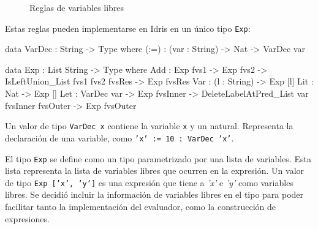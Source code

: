 \begin{figure}[h]

\centering

\begin{subfigure}{0.5\linewidth}
\centering
{}
\end{subfigure}%

\bigskip

\begin{subfigure}{0.5\linewidth}
\centering
{}
\end{subfigure}%

\bigskip

\begin{subfigure}{0.5\linewidth}
\centering
{}
\end{subfigure}%

\bigskip

\begin{subfigure}{0.5\linewidth}
\centering
{}
\end{subfigure}%

\caption{Reglas de variables libres}
\label{fig:RulesFreeVariables}
\end{figure}

Estas reglas pueden implementarse en Idris en un único tipo \texttt{Exp}:

\begin{code}
data VarDec : String -> Type where
  (:=) : (var : String) -> Nat -> VarDec var

data Exp : List String -> Type where
  Add : Exp fvs1 -> Exp fvs2 ->
    IsLeftUnion_List fvs1 fvs2 fvsRes ->
    Exp fvsRes
  Var : (l : String) -> Exp [l]
  Lit : Nat -> Exp []
  Let : VarDec var -> Exp fvsInner ->
    DeleteLabelAtPred_List var fvsInner fvsOuter ->
    Exp fvsOuter
\end{code}

Un valor de tipo \texttt{VarDec x} contiene la variable \texttt{x} y un natural. Representa la declaración de una variable, como \texttt{'x' := 10 : VarDec 'x'}.

El tipo \texttt{Exp} se define como un tipo parametrizado por una lista de variables. Esta lista representa la lista de variables libres que ocurren en la expresión. Un valor de tipo \texttt{Exp ['x', 'y']} es una expresión que tiene a \textit{'x'} e \textit{'y'} como variables libres. Se decidió incluir la información de variables libres en el tipo para poder facilitar tanto la implementación del evaluador, como la construcción de expresiones.


